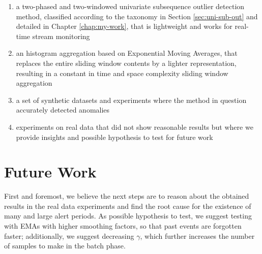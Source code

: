 \begin{enumerate}
    \item a two-phased and two-windowed univariate subsequence outlier detection method, classified according to the taxonomy in Section \ref{sec:uni-sub-out} and detailed in Chapter \ref{chap:my-work}, that is lightweight and works for real-time stream monitoring
    
    \item an histogram aggregation based on Exponential Moving Averages, that replaces the entire sliding window contents by a lighter representation, resulting in a constant in time and space complexity sliding window aggregation
    
    \item a set of synthetic datasets and experiments where the method in question accurately detected anomalies
    
    \item experiments on real data that did not show reasonable results but where we provide insights and possible hypothesis to test for future work
\end{enumerate}

\section{Future Work}

First and foremost, we believe the next steps are to reason about the obtained results in the real data experiments and find the root cause for the existence of many and large alert periods. As possible hypothesis to test, we suggest testing with EMAs with higher smoothing factors, so that past events are forgotten faster; additionally, we suggest decreasing $\gamma$, which further increases the number of samples to make in the batch phase.

